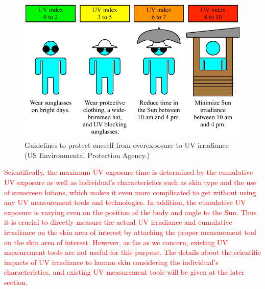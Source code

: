 \documentclass[journal]{IEEEtran}
\begin{document}
\begin{figure}
\centering
\includegraphics[width=1.0\hsize]{Figures/UVI_guideline.pdf}
\caption{Guidelines to protect oneself from overexposure to UV irradiance (US Environmental Protection Agency.)}
\label{fig:guidelines}
\vskip -10pt
\end{figure}
\textcolor{red}{Scientifically, the maximum UV exposure time is determined by the cumulative UV exposure as well as individual's characteristics such as skin type and the use of sunscreen lotions, which makes it even more complicated to get without using any UV measurement tools and technologies. In addition, the cumulative UV exposure is varying even on the position of the body and angle to the Sun. Thus it is crucial to directly measure the actual UV irradiance and cumulative irradiance on the skin area of interest by attaching the proper measurement tool on the skin area of interest. However, as fas as we concern, existing UV measurement tools are not useful for this purpose. The details about the scientific impacts of UV irradiance to human skin considering the individual's characteristics, and existing UV measurement tools will be given at the later section.}
\end{document}

